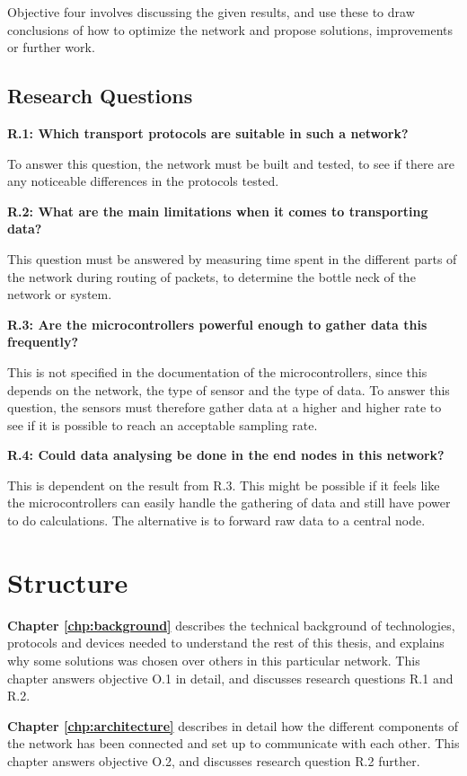 Objective four involves discussing the given results, and use these to draw conclusions of how to optimize the network and propose solutions, improvements or further work. 

\subsection{Research Questions}

\noindent \textbf{R.1: Which transport protocols are suitable in such a network?}

To answer this question, the network must be built and tested, to see if there are any noticeable differences in the protocols tested.

\noindent\textbf{R.2: What are the main limitations when it comes to transporting data?}

This question must be answered by measuring time spent in the different parts of the network during routing of packets, to determine the bottle neck of the network or system. 

\noindent\textbf{R.3: Are the microcontrollers powerful enough to gather data this frequently?}

This is not specified in the documentation of the microcontrollers, since this depends on the network, the type of sensor and the type of data. To answer this question, the sensors must therefore gather data at a higher and higher rate to see if it is possible to reach an acceptable sampling rate. 

\noindent\textbf{R.4: Could data analysing be done in the end nodes in this network?}

This is dependent on the result from R.3. This might be possible if it feels like the microcontrollers can easily handle the gathering of data and still have power to do calculations. The alternative is to forward raw data to a central node. 

\section{Structure}


\noindent \textbf{Chapter \ref{chp:background}} describes the technical background of technologies, protocols and devices needed to understand the rest of this thesis, and explains why some solutions was chosen over others in this particular network. This chapter answers objective O.1 in detail, and discusses research questions R.1 and R.2. 

\noindent \textbf{Chapter \ref{chp:architecture}} describes in detail how the different components of the network has been connected and set up to communicate with each other. This chapter answers objective O.2, and discusses research question R.2 further. 

